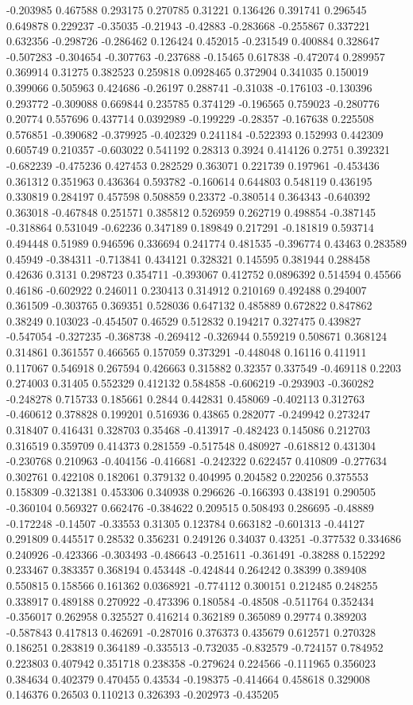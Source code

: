 -0.203985 0.467588 0.293175 0.270785 0.31221 0.136426 0.391741 0.296545 0.649878 0.229237 -0.35035 -0.21943 -0.42883 -0.283668 -0.255867 0.337221 0.632356 -0.298726 -0.286462 0.126424 0.452015 -0.231549 0.400884 0.328647 -0.507283 -0.304654 -0.307763 -0.237688 -0.15465 0.617838 -0.472074 0.289957 0.369914 0.31275 0.382523 0.259818 0.0928465 0.372904 0.341035 0.150019 0.399066 0.505963 0.424686 -0.26197 0.288741 -0.31038 -0.176103 -0.130396 0.293772 -0.309088 0.669844 0.235785 0.374129 -0.196565 0.759023 -0.280776 0.20774 0.557696 0.437714 0.0392989 -0.199229 -0.28357 -0.167638 0.225508 0.576851 -0.390682 -0.379925 -0.402329 0.241184 -0.522393 0.152993 0.442309 0.605749 0.210357 -0.603022 0.541192 0.28313 0.3924 0.414126 0.2751 0.392321 -0.682239 -0.475236 0.427453 0.282529 0.363071 0.221739 0.197961 -0.453436 0.361312 0.351963 0.436364 0.593782 -0.160614 0.644803 0.548119 0.436195 0.330819 0.284197 0.457598 0.508859 0.23372 -0.380514 0.364343 -0.640392 0.363018 -0.467848 0.251571 0.385812 0.526959 0.262719 0.498854 -0.387145 -0.318864 0.531049 -0.62236 0.347189 0.189849 0.217291 -0.181819 0.593714 0.494448 0.51989 0.946596 0.336694 0.241774 0.481535 -0.396774 0.43463 0.283589 0.45949 -0.384311 -0.713841 0.434121 0.328321 0.145595 0.381944 0.288458 0.42636 0.3131 0.298723 0.354711 -0.393067 0.412752 0.0896392 0.514594 0.45566 0.46186 -0.602922 0.246011 0.230413 0.314912 0.210169 0.492488 0.294007 0.361509 -0.303765 0.369351 0.528036 0.647132 0.485889 0.672822 0.847862 0.38249 0.103023 -0.454507 0.46529 0.512832 0.194217 0.327475 0.439827 -0.547054 -0.327235 -0.368738 -0.269412 -0.326944 0.559219 0.508671 0.368124 0.314861 0.361557 0.466565 0.157059 0.373291 -0.448048 0.16116 0.411911 0.117067 0.546918 0.267594 0.426663 0.315882 0.32357 0.337549 -0.469118 0.2203 0.274003 0.31405 0.552329 0.412132 0.584858 -0.606219 -0.293903 -0.360282 -0.248278 0.715733 0.185661 0.2844 0.442831 0.458069 -0.402113 0.312763 -0.460612 0.378828 0.199201 0.516936 0.43865 0.282077 -0.249942 0.273247 0.318407 0.416431 0.328703 0.35468 -0.413917 -0.482423 0.145086 0.212703 0.316519 0.359709 0.414373 0.281559 -0.517548 0.480927 -0.618812 0.431304 -0.230768 0.210963 -0.404156 -0.416681 -0.242322 0.622457 0.410809 -0.277634 0.302761 0.422108 0.182061 0.379132 0.404995 0.204582 0.220256 0.375553 0.158309 -0.321381 0.453306 0.340938 0.296626 -0.166393 0.438191 0.290505 -0.360104 0.569327 0.662476 -0.384622 0.209515 0.508493 0.286695 -0.48889 -0.172248 -0.14507 -0.33553 0.31305 0.123784 0.663182 -0.601313 -0.44127 0.291809 0.445517 0.28532 0.356231 0.249126 0.34037 0.43251 -0.377532 0.334686 0.240926 -0.423366 -0.303493 -0.486643 -0.251611 -0.361491 -0.38288 0.152292 0.233467 0.383357 0.368194 0.453448 -0.424844 0.264242 0.38399 0.389408 0.550815 0.158566 0.161362 0.0368921 -0.774112 0.300151 0.212485 0.248255 0.338917 0.489188 0.270922 -0.473396 0.180584 -0.48508 -0.511764 0.352434 -0.356017 0.262958 0.325527 0.416214 0.362189 0.365089 0.29774 0.389203 -0.587843 0.417813 0.462691 -0.287016 0.376373 0.435679 0.612571 0.270328 0.186251 0.283819 0.364189 -0.335513 -0.732035 -0.832579 -0.724157 0.784952 0.223803 0.407942 0.351718 0.238358 -0.279624 0.224566 -0.111965 0.356023 0.384634 0.402379 0.470455 0.43534 -0.198375 -0.414664 0.458618 0.329008 0.146376 0.26503 0.110213 0.326393 -0.202973 -0.435205 